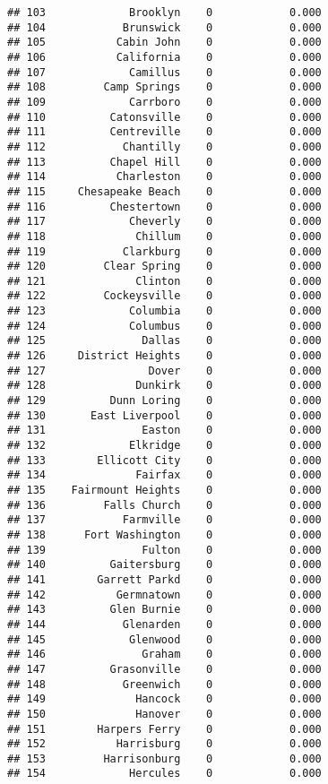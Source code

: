\documentclass[]{article}
\begin{document}
\begin{verbatim}
## 103             Brooklyn    0            0.000
## 104            Brunswick    0            0.000
## 105           Cabin John    0            0.000
## 106           California    0            0.000
## 107             Camillus    0            0.000
## 108         Camp Springs    0            0.000
## 109             Carrboro    0            0.000
## 110          Catonsville    0            0.000
## 111          Centreville    0            0.000
## 112            Chantilly    0            0.000
## 113          Chapel Hill    0            0.000
## 114           Charleston    0            0.000
## 115     Chesapeake Beach    0            0.000
## 116          Chestertown    0            0.000
## 117             Cheverly    0            0.000
## 118              Chillum    0            0.000
## 119            Clarkburg    0            0.000
## 120         Clear Spring    0            0.000
## 121              Clinton    0            0.000
## 122         Cockeysville    0            0.000
## 123             Columbia    0            0.000
## 124             Columbus    0            0.000
## 125               Dallas    0            0.000
## 126     District Heights    0            0.000
## 127                Dover    0            0.000
## 128              Dunkirk    0            0.000
## 129          Dunn Loring    0            0.000
## 130       East Liverpool    0            0.000
## 131               Easton    0            0.000
## 132             Elkridge    0            0.000
## 133        Ellicott City    0            0.000
## 134              Fairfax    0            0.000
## 135    Fairmount Heights    0            0.000
## 136         Falls Church    0            0.000
## 137            Farmville    0            0.000
## 138      Fort Washington    0            0.000
## 139               Fulton    0            0.000
## 140          Gaitersburg    0            0.000
## 141        Garrett Parkd    0            0.000
## 142           Germnatown    0            0.000
## 143          Glen Burnie    0            0.000
## 144            Glenarden    0            0.000
## 145             Glenwood    0            0.000
## 146               Graham    0            0.000
## 147          Grasonville    0            0.000
## 148            Greenwich    0            0.000
## 149              Hancock    0            0.000
## 150              Hanover    0            0.000
## 151        Harpers Ferry    0            0.000
## 152           Harrisburg    0            0.000
## 153         Harrisonburg    0            0.000
## 154             Hercules    0            0.000

\end{verbatim}
\end{document}
